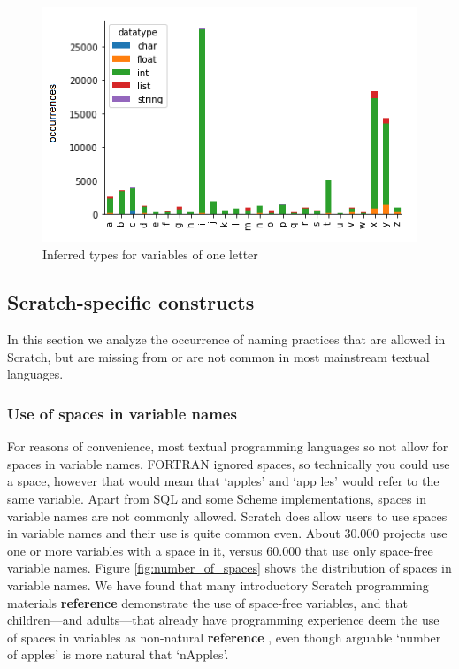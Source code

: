 \documentclass[conference]{IEEEtran}
\newcommand{\todo}[1]{ \textbf{#1} }
\begin{document}
\begin{figure}
	\begin{center}
		\includegraphics[width=\columnwidth]{fig/singleletter_type_occurrences}
		\caption{Inferred types for variables of one letter}
		\label{fig:one_letter_type}
	\end{center}
\end{figure} 

\subsection{Scratch-specific constructs}
\label{res:Scratch:specific}
In this section we analyze the occurrence of naming practices that are allowed in Scratch, but are missing from or are not common in most mainstream textual languages.

\subsubsection{Use of spaces in variable names}
For reasons of convenience, most textual programming languages so not allow for spaces in variable names. FORTRAN ignored spaces, so technically you could use a space, however that would mean that `apples' and `app les' would refer to the same variable. Apart from SQL and some Scheme implementations, spaces in variable names are not commonly allowed. Scratch does allow users to use spaces in variable names and their use is quite common even. About 30.000 projects use one or more variables with a space in it, versus 60.000 that use only space-free variable names. Figure \ref{fig:number_of_spaces} shows the distribution of spaces in variable names. We have found that many introductory Scratch programming materials \todo{reference} demonstrate the use of space-free variables, and that children---and adults---that already have programming experience deem the use of spaces in variables as non-natural\todo{reference}, even though arguable `number of apples' is more natural that `nApples'.
\end{document}
